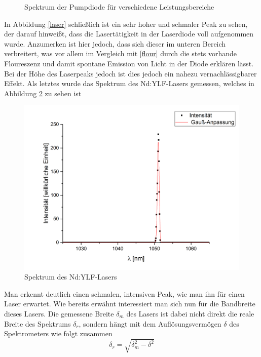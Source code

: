 \begin{figure}[H]
\begin{center}
		\caption{Spektrum der Pumpdiode für verschiedene Leistungsbereiche}
		\label{spek1}
	\end{center}
\end{figure}
In Abbildung \ref{laser} schließlich ist ein sehr hoher und schmaler Peak zu sehen, der darauf hinweißt, dass die Lasertätigkeit in der Laserdiode voll aufgenommen wurde. Anzumerken ist hier jedoch, dass sich dieser im unteren Bereich verbreitert, was vor allem im Vergleich mit \ref{flour} durch die stets vorhande Floureszenz und damit spontane Emission von Licht in der Diode erklären lässt. Bei der Höhe des Laserpeaks jedoch ist dies jedoch ein nahezu vernachlässigbarer Effekt. \newline
Als letztes wurde das Spektrum des Nd:YLF-Lasers gemessen, welches in  Abbildung \ref{lasery} zu sehen ist
\begin{figure}[H]
	\begin{center}
		\includegraphics[scale=.5]{Bilder/Lasery.png}
		\caption{Spektrum des Nd:YLF-Lasers}
		\label{lasery}
	\end{center}
\end{figure}
Man erkennt deutlich einen schmalen, intensiven Peak, wie man ihn für einen Laser erwartet. Wie bereits erwähnt interessiert man sich nun für die Bandbreite dieses Lasers. Die gemessene Breite $\delta_m$ des Lasers ist dabei nicht direkt die reale Breite des Spektrums $\delta_r$, sondern hängt mit dem Auflösungsvermögen $\delta$ des Spektrometers wie folgt zusammen
\begin{equation}
\delta_r=\sqrt{\delta_m^2-\delta^2}
\label{breite}
\end{equation}
